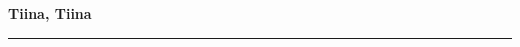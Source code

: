 \documentclass[10pt]{book}
\begin{document}
{
  \samepage
  \raggedbottom
  \raggedright
  \sloppy


  \vspace{0.2in}

  \noindent\begin{minipage}{.1\textwidth}
    \hfill\vspace{0.1in}
  \end{minipage}%
  \noindent\begin{minipage}{.8\textwidth}
    \centering
    \bfseries
    \large Tiina, Tiina
  \end{minipage}%
  \noindent\begin{minipage}{.1\textwidth}
      \hfill\vspace{0.1in}
  \end{minipage}

  \nopagebreak[4]
  \vspace{0.1in}
  \nopagebreak[4]
  \hrule height 0.05ex
  \nopagebreak[4]
  \vspace{-0.05in}




}
\end{document}
